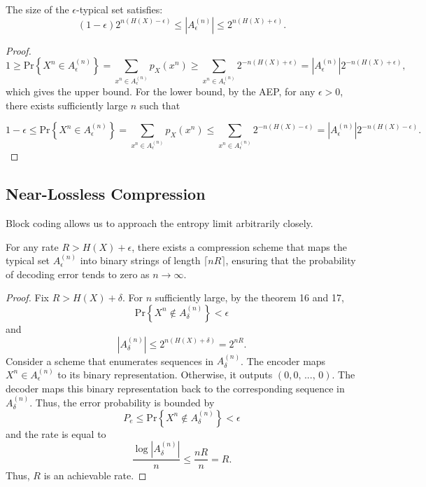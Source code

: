 \begin{theorem}
The size of the $\epsilon$-typical set satisfies:
\[
(1-\epsilon)2^{n(H(X)-\epsilon)} \le |A_{\epsilon}^{(n)}| \le 2^{n(H(X)+\epsilon)}.
\]
\end{theorem}
\begin{proof}
\[
1 \geq \text{Pr}\left\{X^n \in A_{\epsilon}^{(n)}\right\}
= \sum_{x^n \in A_{\epsilon}^{(n)}} p_X(x^n)
\geq \sum_{x^n \in A_{\epsilon}^{(n)}} 2^{-n(H(X) + \epsilon)}
= \left|A_{\epsilon}^{(n)}\right| 2^{-n(H(X) + \epsilon)},
\]
which gives the upper bound. For the lower bound, by the AEP, for any \(\epsilon > 0\), there exists sufficiently large \(n\) such that

\[
1 - \epsilon \leq \text{Pr}\left\{X^n \in A_{\epsilon}^{(n)}\right\}
= \sum_{x^n \in A_{\epsilon}^{(n)}} p_X(x^n)
\leq \sum_{x^n \in A_{\epsilon}^{(n)}} 2^{-n(H(X) - \epsilon)}
= \left|A_{\epsilon}^{(n)}\right| 2^{-n(H(X) - \epsilon)}.
\]
\end{proof}

\subsection{Near-Lossless Compression}
Block coding allows us to approach the entropy limit arbitrarily closely.

\begin{theorem}[Achievability]
For any rate $R>H(X)+\epsilon$, there exists a compression scheme that maps the typical set $A_{\epsilon}^{(n)}$ into binary strings of length $\lceil nR\rceil$, ensuring that the probability of decoding error tends to zero as $n\to\infty$.
\end{theorem}
\begin{proof}
Fix $R > H(X) + \delta$. For $n$ sufficiently large, by the theorem 16 and 17, 
$$
\text{Pr}\left\{X^n \notin A_\delta^{(n)}\right\} < \epsilon
$$
and
$$
\left|A_\delta^{(n)}\right| \leq2^{n(H(X)+\delta)}=2^{nR}.
$$
Consider a scheme that enumerates sequences in $A_{\delta}^{(n)}$. The encoder maps $X^n \in A_\epsilon^{(n)}$ to its binary representation. Otherwise, it outputs $(0,0,\,...,\,0)$. The decoder maps this binary representation back to the corresponding sequence in $A_\delta^{(n)}.$ Thus, the error probability is bounded by
$$
P_e \leq \text{Pr}\left\{X^n \notin A_\delta^{(n)}\right\} < \epsilon
$$
and the rate is equal to
$$
\frac{\log \left|A_\delta^{(n)}\right|}{n} \leq \frac{nR}{n}=R.
$$
Thus, $R$ is an achievable rate.
\end{proof}

